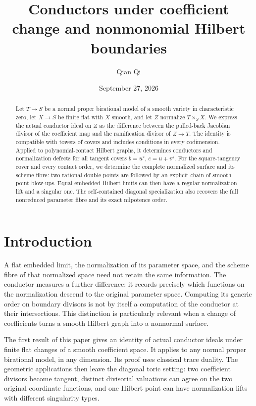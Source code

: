\documentclass[11pt,reqno]{amsart}
\numberwithin{equation}{section}
\theoremstyle{definition}\newtheorem{definition}[theorem]{Definition}
\theoremstyle{remark}\newtheorem{remark}[theorem]{Remark}
\begin{document}
\title{Conductors under coefficient change and nonmonomial Hilbert boundaries}
\author{Qian Qi}
\date{September 27, 2026}
\begin{abstract}
Let $T\to S$ be a normal proper birational model of a smooth variety in
characteristic zero, let $X\to S$ be finite flat with $X$ smooth, and
let $Z$ normalize $T\times_S X$. We express the actual conductor ideal
on $Z$ as the difference between the pulled-back Jacobian divisor of
the coefficient map and the ramification divisor of $Z\to T$. The
identity is compatible with towers of covers and includes conditions
in every codimension. Applied to polynomial-contact Hilbert graphs,
it determines conductors and normalization defects for all tangent
covers $b=u^r$, $c=u+v^s$. For the square-tangency cover and every
contact order, we determine the complete normalized surface and its
scheme fibre: two rational double points are followed by an explicit
chain of smooth point blow-ups. Equal embedded Hilbert limits can
then have a regular normalization lift and a singular one. The
self-contained diagonal specialization also recovers the full
nonreduced parameter fibre and its exact nilpotence order.
\end{abstract}
\maketitle

\section{Introduction}\label{sec:introduction-v171}
A flat embedded limit, the normalization of its parameter space, and
the scheme fibre of that normalized space need not retain the same
information. The conductor measures a further difference: it records
precisely which functions on the normalization descend to the original
parameter space. Computing its generic order on boundary divisors is
not by itself a computation of the conductor at their intersections.
This distinction is particularly relevant when a change of coefficients
turns a smooth Hilbert graph into a nonnormal surface.

The first result of this paper gives an identity of actual conductor
ideals under finite flat changes of a smooth coefficient space. It
applies to any normal proper birational model, in any dimension. Its
proof uses classical trace duality. The geometric applications then
leave the diagonal toric setting: two coefficient divisors become
tangent, distinct divisorial valuations can agree on the two original
coordinate functions, and one Hilbert point can have normalization
lifts with different singularity types.
\end{document}
